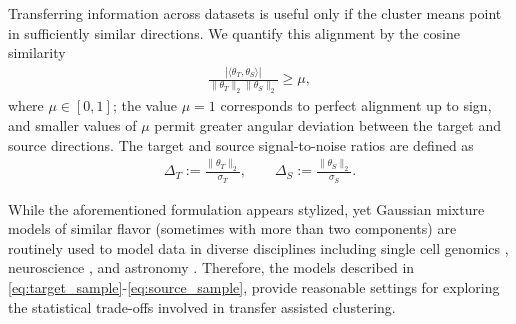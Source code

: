 \documentclass[10pt]{article}
\newcommand{\ip}[2]{\langle #1,#2\rangle}
\newcommand{\norm}[1]{\lVert #1\rVert}
\newcommand{\trg}{T}
\newcommand{\thetaT}{\theta_{\trg}}
\newcommand{\sigmaT}{\sigma_{\trg}}
\newcommand{\DeltaT}{\Delta_{\trg}}
\newcommand{\src}{S}
\newcommand{\thetaS}{\theta_{\src}}
\newcommand{\sigmaS}{\sigma_{\src}}
\newcommand{\DeltaS}{\Delta_{\src}}
\begin{document}
Transferring information across datasets is useful only if the cluster means point in sufficiently similar directions. We quantify this alignment by the cosine similarity
\begin{align}
    \label{eq:alignment}
    \frac{|\ip{\thetaT}{\thetaS}|}{\norm{\thetaT}_2 \norm{\thetaS}_2} \geq \mu,
\end{align}
where $\mu \in [0, 1]$; the value $\mu = 1$ corresponds to perfect
alignment up to sign, and smaller values of $\mu$ permit greater
angular deviation between the target and source directions.
The target and source signal-to-noise ratios are defined as
\begin{align}
    \label{eq:def_delta_snr}
    \DeltaT := \frac{\norm{\thetaT}_2}{\sigmaT},
    \qquad
    \DeltaS := \frac{\norm{\thetaS}_2}{\sigmaS}.
\end{align}

While the aforementioned formulation appears stylized, yet Gaussian mixture models of similar flavor (sometimes with more than two components) are routinely used to model data in diverse disciplines including single cell genomics \citep{zhong2022empirical,cao2025modah}, neuroscience \citep{Nezhadmoghadam2021-wl}, and astronomy \citep{10.1093/mnras/stx1024}. Therefore, the models described in \eqref{eq:target_sample}-\eqref{eq:source_sample}, provide reasonable settings for exploring the statistical trade-offs involved in transfer assisted clustering.
\end{document}
